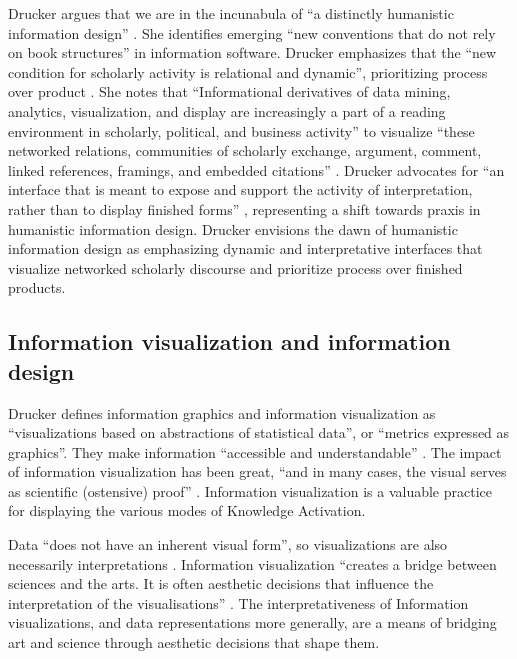 Drucker argues that we are in the incunabula of “a distinctly humanistic information design” \citep[p. 176]{drucker_graphesis_2014}. She identifies emerging “new conventions that do not rely on book structures” \citep[p. 176]{drucker_graphesis_2014} in information software. Drucker emphasizes that the “new condition for scholarly activity is relational and dynamic”, prioritizing process over product \citep[p. 176]{drucker_graphesis_2014}. She notes that “Informational derivatives of data mining, analytics, visualization, and display are increasingly a part of a reading environment in scholarly, political, and business activity” to visualize “these networked relations, communities of scholarly exchange, argument, comment, linked references, framings, and embedded citations” \citep[p. 176]{drucker_graphesis_2014} . Drucker advocates for “an interface that is meant to expose and support the activity of interpretation, rather than to display finished forms” \citep[p. 178-179]{drucker_graphesis_2014}, representing a shift towards praxis in humanistic information design. Drucker envisions the dawn of humanistic information design as emphasizing dynamic and interpretative interfaces that visualize networked scholarly discourse and prioritize process over finished products.
\subsection{Information visualization and information design }
Drucker defines information graphics and information visualization as “visualizations based on abstractions of statistical data”, or “metrics expressed as graphics”. They make information “accessible and understandable” \citep[p. 186]{sevaldson_designing_2022}. The impact of information visualization has been great, “and in many cases, the visual serves as scientific (ostensive) proof” \citep[p. 186]{sevaldson_designing_2022}. Information visualization is a valuable practice for displaying the various modes of Knowledge Activation. 

Data “does not have an inherent visual form”, so visualizations are also necessarily interpretations \citep[p. 6]{drucker_graphesis_2014}. Information visualization “creates a bridge between sciences and the arts. It is often aesthetic decisions that influence the interpretation of the visualisations” \citep[p. 186]{sevaldson_designing_2022}. The interpretativeness of Information visualizations, and data representations more generally, are a means of bridging art and science through aesthetic decisions that shape them.

